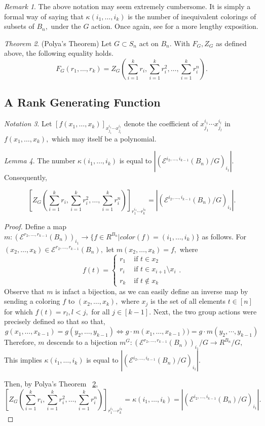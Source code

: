 \documentclass[10 pt]{amsart}
\theoremstyle{plain}
\theoremstyle{definition}
\theoremstyle{remark}
\numberwithin{equation}{section}
\newtheorem{thm}{Theorem}[section]
\newtheorem{lem}[thm]{Lemma}
\theoremstyle{remark}
\newtheorem{rem}[thm]{Remark}
\newtheorem{note}[thm]{Notation}
\newcommand\ssec{\subsection}
\renewcommand{\iff}{\Leftrightarrow}
\begin{document}
\begin{rem}
The above notation may seem extremely cumbersome. It is simply a formal way of saying that $\kappa(i_1,\ldots, i_k)$ is the number of inequivalent colorings of subsets of $B_n,$ under the $G$ action. Once again, see \cite[Chapter 7]{algebraic_stanley} for a more lengthy exposition.
\end{rem}

\begin{thm}
\label{thm:polya}
(Polya's Theorem)
Let $G \subset S_n$ act on $B_n.$ With $F_G,Z_G$ as defined above, the following equality holds.
$$F_G(r_1,\ldots, r_k) = Z_G(\sum_{i=1}^k r_i,\sum_{i=1}^k r_i^2,\ldots, \sum_{i=1}^k r_i^n).$$
\end{thm}


\ssec{A Rank Generating Function}


\begin{note}
Let $[f(x_1,\ldots, x_k)]_{x_{j_1}^{i_1}\cdots x_{j_l}^{i_l}}$ denote the coefficient of $x_{j_1}^{i_1}\cdots x_{j_l}^{i_l}$ in $f(x_1,\ldots, x_k),$ which may itself be a polynomial.
\end{note}

\begin{lem}
\label{lem:polya_faces_equivlence}
The number $\kappa(i_1,\ldots, i_k)$ is equal to $|(\mathcal E^{i_2,\ldots, i_{k-1}}(B_n)/G)_{i_1}|.$ Consequently, 

$$[Z_G(\sum_{i=1}^k r_i,\sum_{i=1}^k r_i^2,\ldots, \sum_{i=1}^k r_i^n)]_{r_1^{i_1} \cdots r_k^{i_k}}=|(\mathcal E^{i_2,\ldots, i_{k-1}}(B_n)/G)_{i_1}|.$$
\end{lem}
\begin{proof}
Define a map $m:(\mathcal E^{r_2,\ldots, r_{k-1}}(B_n))_{i_1} \rightarrow \{f \in R^{B_n}|color(f) =(i_1,\ldots, i_k)\}$ as follows. For $(x_2,\ldots, x_{k}) \in \mathcal E^{r_2,\ldots, r_{k-1}}(B_n),$ let $m(x_2,\ldots, x_{k}) = f,$ where 
$$f(t) = \begin{cases} r_1 &\text{ if } t\in x_2\\
r_i &\text{ if } t \in x_{i+1}\setminus x_i\\
r_k &\text{ if } t \notin x_k
\end{cases}.$$
Observe that $m$ is infact a bijection, as we can easily define an inverse map by sending a coloring $f$ to $(x_2,\ldots, x_{k}),$ where $x_j$ is the set of all elements $t \in [n]$ for which $f(t) = r_l,l<j,$ for all $j \in [k-1].$ 
Next, the two group actions were precisely defined so that so that, 
$$g(x_1,\ldots, x_{k-1}) = g(y_2,\ldots, y_{k-1}) \iff g\cdot m(x_1,\ldots, x_{k-1})) = g\cdot m(y_2, \cdots, y_{k-1})$$
Therefore, $m$ descends to a bijection $m^G:(\mathcal E^{r_2,\ldots, r_{k-1}}(B_n))_{i_1}/G \rightarrow R^{B_n}/G,$ This implies $\kappa(i_1,\ldots, i_k)$ is equal to $|(\mathcal E^{i_2,\ldots, i_{k-1}}(B_n)/G)_{i_1}|.$ 

Then, by Polya's Theorem ~\ref{thm:polya},  
$$[Z_G(\sum_{i=1}^k r_i,\sum_{i=1}^k r_i^2,\ldots, \sum_{i=1}^k r_i^n)]_{r_1^{i_1} \cdots r_k^{i_k}}=\kappa(i_1,\ldots, i_k)=|(\mathcal E^{i_2,\ldots, i_{k-1}}(B_n)/G)_{i_1}|.$$
\end{proof}
\end{document}
